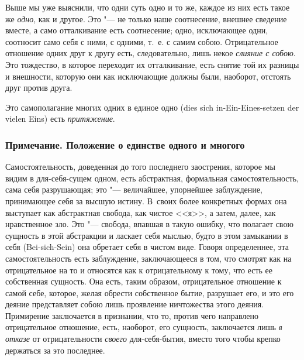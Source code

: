 Выше мы уже выяснили, что одни суть одно и то же, каждое из них есть такое
же {\em одно}, как и другое. Это "--- не только наше
соотнесение, внешнее сведение вместе, а само отталкивание есть соотнесение;
одно, исключающее одни, соотносит само себя с ними, с одними, т.~е. с самим
собою. Отрицательное отношение одних друг к другу есть, следовательно, лишь
некое {\em слияние с собою}. Это тождество, в которое
переходит их отталкивание, есть снятие той их разницы и внешности, которую
они как исключающие должны были, наоборот, отстоять друг против друга.

Это самополагание многих одних в единое одно (dies sich
in-Ein-Eines-setzen der vielen Eins) есть {\em притяжение}.

\subsubsection[Примечание. Положение о единстве одного и многого]
{Примечание. Положение о единстве одного и многого}

Самостоятельность, доведенная до того последнего заострения, которое мы
видим в для-себя-сущем одном, есть абстрактная, формальная
самостоятельность, сама себя разрушающая; это "--- величайшее, упорнейшее
заблуждение, принимающее себя за высшую истину. В~своих более конкретных
формах она выступает как абстрактная свобода, как чистое <<я>>, а затем,
далее, как нравственное зло. Это "--- свобода, впавшая в такую ошибку, что
полагает свою сущность в этой абстракции и ласкает себя мыслью, будто в
этом замыкании в себя (Bei-sich-Sein) она обретает себя в чистом виде.
Говоря определеннее, эта самостоятельность есть заблуждение, заключающееся
в том, что смотрят как на отрицательное на то и относятся как к
отрицательному к тому, что есть ее собственная сущность. Она есть, таким
образом, отрицательное отношение к самой себе, которое, желая обрести
собственное бытие, разрушает его, и это его деяние представляет собою лишь
проявление ничтожества этого деяния. Примирение заключается в признании,
что то, против чего направлено отрицательное отношение, есть, наоборот, его
сущность, заключается лишь {\em в отказе} от
отрицательности {\em своего} для-себя-бытия, вместо
того чтобы крепко держаться за это последнее.

